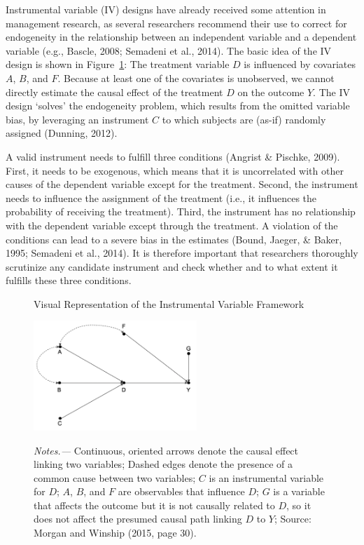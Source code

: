\documentclass[english]{article}
\begin{document}
\noindent Instrumental variable (IV) designs have already received some attention
in management research, as several researchers recommend their use to
correct for endogeneity in the relationship between an independent
variable and a dependent variable (e.g., Bascle, 2008; Semadeni et al.,
2014). The basic idea of the IV design is shown in Figure~\ref{fig:iv_path}: The
treatment variable $D$ is influenced by covariates $A$, $B$, and
$F$. Because at least one of the covariates is unobserved, we cannot
directly estimate the causal effect of the treatment $D$ on the
outcome $Y$. The IV design `solves' the endogeneity problem, which
results from the omitted variable bias, by leveraging an instrument
$C$ to which subjects are (as-if) randomly assigned (Dunning, 2012).

A valid instrument needs to fulfill three conditions (Angrist \&
Pischke, 2009). First, it needs to be exogenous, which means that it is
uncorrelated with other causes of the dependent variable except for the
treatment. Second, the instrument needs to influence the assignment of
the treatment (i.e., it influences the probability of receiving the
treatment). Third, the instrument has no relationship with the dependent
variable except through the treatment. A violation of the conditions can
lead to a severe bias in the estimates (Bound, Jaeger, \& Baker, 1995;
Semadeni et al., 2014). It is therefore important that researchers
thoroughly scrutinize any candidate instrument and check whether and to
what extent it fulfills these three conditions.

\begin{figure}[!htbp]
	\centering
	\caption{Visual Representation of the Instrumental Variable Framework}
	\includegraphics[width=0.55\textwidth]{_5}
	\label{fig:iv_path}
	\caption*{\textit{Notes.---} Continuous, oriented arrows denote the
		causal effect linking two variables; Dashed edges denote the
		presence of a common cause between two variables; $C$ is an
		instrumental variable for $D$; $A$, $B$, and $F$ are
		observables that influence $D$; $G$ is a variable that affects
		the outcome but it is not causally related to $D$, so it does
not affect the presumed causal path linking $D$ to $Y$; Source: Morgan and
Winship (2015, page 30).}
\end{figure} 
\end{document}
